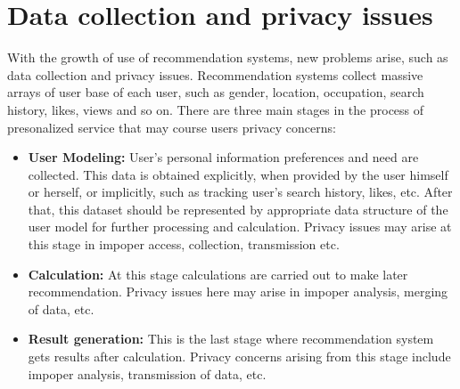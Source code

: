 \documentclass[10pt,twocolumn,twoside,a4paper]{report} %
\begin{document}
\section{Data collection and privacy issues} \label{data_issues}
With the growth of use of recommendation systems, new problems arise, such as data collection and privacy issues.
Recommendation systems collect massive arrays of user base of each user, such as gender, location, occupation, search history, likes, views and so on.
There are three \cite{PrivacyProtectionSurvey} main stages in the process of presonalized service that may course users privacy concerns:
\begin{itemize}
    \item \textbf{User Modeling:} User's personal information preferences and need are collected. This data is obtained explicitly, when provided by the user himself or herself, or implicitly, such as tracking user's search history, likes, etc. After that, this dataset should be represented by appropriate data structure of the user model for further processing and calculation. Privacy issues may arise at this stage in impoper access, collection, transmission etc.
    \item \textbf{Calculation:} At this stage calculations are carried out to make later recommendation. Privacy issues here may arise in impoper analysis, merging of data, etc.
    \item \textbf{Result generation:} This is the last stage where recommendation system gets results after calculation. Privacy concerns arising from this stage include impoper analysis, transmission of data, etc.
\end{itemize}
\end{document}
